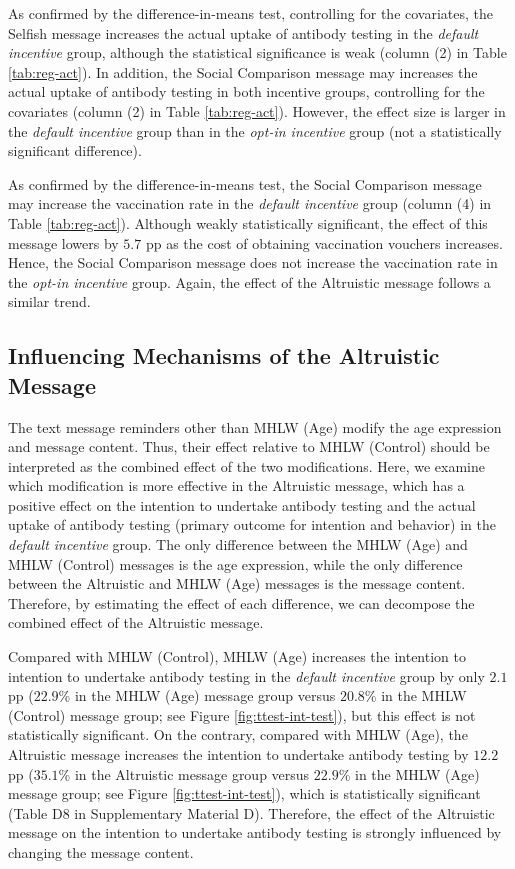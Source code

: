 \documentclass[
  11pt,
  a4paper
]{article}
\begin{document}
As confirmed by the difference-in-means test, controlling for the covariates, the Selfish message increases the actual uptake of antibody testing in the \emph{default incentive} group, although the statistical significance is weak (column (2) in Table \ref{tab:reg-act}). In addition, the Social Comparison message may increases the actual uptake of antibody testing in both incentive groups, controlling for the covariates (column (2) in Table \ref{tab:reg-act}). However, the effect size is larger in the \emph{default incentive} group than in the \emph{opt-in incentive} group (not a statistically significant difference).

As confirmed by the difference-in-means test, the Social Comparison message may increase the vaccination rate in the \emph{default incentive} group (column (4) in Table \ref{tab:reg-act}). Although weakly statistically significant, the effect of this message lowers by \(5.7\) pp as the cost of obtaining vaccination vouchers increases. Hence, the Social Comparison message does not increase the vaccination rate in the \emph{opt-in incentive} group. Again, the effect of the Altruistic message follows a similar trend.

\hypertarget{influencing-mechanisms-of-the-altruistic-message}{%
\subsection{Influencing Mechanisms of the Altruistic Message}\label{influencing-mechanisms-of-the-altruistic-message}}

The text message reminders other than MHLW (Age) modify the age expression and message content. Thus, their effect relative to MHLW (Control) should be interpreted as the combined effect of the two modifications. Here, we examine which modification is more effective in the Altruistic message, which has a positive effect on the intention to undertake antibody testing and the actual uptake of antibody testing (primary outcome for intention and behavior) in the \emph{default incentive} group. The only difference between the MHLW (Age) and MHLW (Control) messages is the age expression, while the only difference between the Altruistic and MHLW (Age) messages is the message content. Therefore, by estimating the effect of each difference, we can decompose the combined effect of the Altruistic message.

Compared with MHLW (Control), MHLW (Age) increases the intention to intention to undertake antibody testing in the \emph{default incentive} group by only \(2.1\) pp (\(22.9\)\% in the MHLW (Age) message group versus \(20.8\)\% in the MHLW (Control) message group; see Figure \ref{fig:ttest-int-test}), but this effect is not statistically significant. On the contrary, compared with MHLW (Age), the Altruistic message increases the intention to undertake antibody testing by \(12.2\) pp (\(35.1\)\% in the Altruistic message group versus \(22.9\)\% in the MHLW (Age) message group; see Figure \ref{fig:ttest-int-test}), which is statistically significant (Table D8 in Supplementary Material D). Therefore, the effect of the Altruistic message on the intention to undertake antibody testing is strongly influenced by changing the message content.
\end{document}
